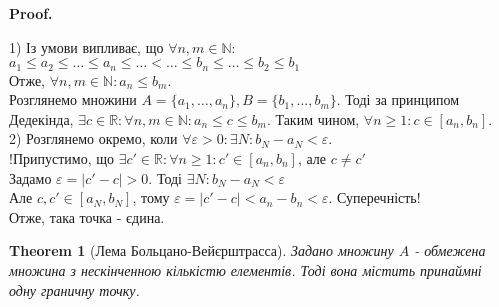 \documentclass[a4paper, 14pt]{article}
\makeatletter
\def\qed{$\blacksquare$}
\theoremstyle{theoremdd}
\newtheorem{theorem}{Theorem}[subsection]
\theoremstyle{theoremdd}
\theoremstyle{theoremdd}
\theoremstyle{theoremdd}
\theoremstyle{theoremdd}
\theoremstyle{theoremdd}
\theoremstyle{theoremdd}
\theoremstyle{theoremdd}
\renewenvironment{proof}[1][Proof.\\]{\par
\pushQED{\hfill \qed}%
\normalfont \topsep6\p@\@plus6\p@\relax
\trivlist
\item\relax
{\bfseries
#1\@addpunct{.}}\hspace\labelsep\ignorespaces
}{%
\popQED\endtrivlist\@endpefalse
}
\makeatother
\begin{document}
	\begin{proof}
	1) Із умови випливає, що $\forall n,m \in \mathbb{N}:$\\
	$a_1 \leq a_2 \leq \dots \leq a_n \leq \dots < \dots \leq b_n \leq \dots \leq b_2 \leq b_1$\\
	Отже, $\forall n,m \in \mathbb{N}: a_n \leq b_m$.\\
	Розглянемо множини $A = \{a_1,\dots,a_n\}, B = \{b_1, \dots, b_m\}$.
	Тоді за принципом Дедекінда, $\exists c \in \mathbb{R}: \forall n,m \in \mathbb{N}: a_n \leq c \leq b_m$.
	Таким чином, $\forall n \geq 1: c \in [a_n,b_n]$.
	\bigskip \\
	2) Розглянемо окремо, коли $\forall \varepsilon > 0: \exists N: b_N - a_N < \varepsilon$.\\
	!Припустимо, що $\exists c' \in \mathbb{R}: \forall n \geq 1: c' \in [a_n,b_n]$, але $c \neq c'$\\
	Задамо $\varepsilon = |c' - c| > 0$.
	Тоді $\exists N: b_N - a_N < \varepsilon$\\
	Але $c,c' \in [a_N,b_N]$, тому $\varepsilon = |c'-c| < a_n-b_n < \varepsilon$. Суперечність!\\
	Отже, така точка - єдина.
	\end{proof}
	
	\begin{theorem}[Лема Больцано-Вейєрштрасса]
	Задано множину $A$ - обмежена множина з нескінченною кількістю елементів. Тоді вона містить принаймні одну граничну точку.
	\end{theorem}
	
\end{document}
